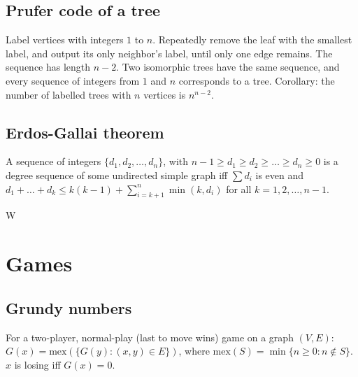 \documentclass[12pt]{extarticle}
\begin{document}
\begin{multicols*}{2}
\subsection{Prufer code of a tree}
Label vertices with integers $1$ to $n$.
Repeatedly remove the leaf with the smallest label, and output its only
neighbor's label, until only one edge remains. The sequence has
length $n-2$.  Two isomorphic trees have the same sequence, and every sequence
of integers from $1$ and $n$ corresponds to a tree.
Corollary: the number of labelled trees with $n$ vertices is $n^{n-2}$.  %

\subsection{Erdos-Gallai theorem}
A sequence of integers $\{ d_1, d_2, \dots, d_n \}$,
with $n-1 \ge d_1 \ge d_2 \ge \dots \ge d_n \ge 0$ is a degree sequence
of some undirected simple graph iff $\sum d_i$ is even and
$d_1 + \dots + d_k \le k(k-1) + \sum_{i=k+1}^n \min(k, d_{i})$
for all $k=1,2,\dots,n-1$.

W

\section{Games}

\subsection{Grundy numbers}
For a two-player, normal-play (last to move wins) game on a graph $(V,E)$:
$G(x) = \mbox{mex}(\{ G(y) : (x, y) \in E \})$,
where $\mbox{mex}(S) = \min \{ n \ge 0: n \not\in S \}$.
$x$ is losing iff $G(x) = 0$.




\end{multicols*}
\end{document}
